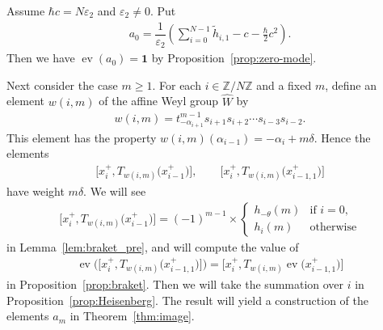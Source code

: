 \documentclass[10pt,a4paper]{amsart}
\theoremstyle{definition}
\numberwithin{equation}{section}
\DeclareMathOperator{\ev}{ev}
\newcommand{\ve}{\varepsilon}
\newcommand{\bbZ}{\mathbb{Z}}
\newcommand{\bfid}{\mathbf{1}}
\begin{document}
Assume $\hbar c = N \ve_2$ and $\ve_2 \neq 0$. Put
\begin{gather*}
a_0 = \dfrac{1}{\ve_2} \left( \sum_{i=0}^{N-1} \tilde{h}_{i,1} - c - \tfrac{\hbar}{2} c^2\right).
\end{gather*}
Then we have $\ev(a_0) = \bfid$ by Proposition~\ref{prop:zero-mode}.

Next consider the case $m \geq 1$. For each $i \in \bbZ/N\bbZ$ and a fixed $m$, define an element $w(i,m)$ of the affine Weyl group $\hat{W}$ by
\begin{gather*}
w(i,m) = t_{-\alpha_{i+1}}^{m-1} s_{i+1} s_{i+2} \cdots s_{i-3} s_{i-2}.
\end{gather*}
This element has the property $w(i,m)(\alpha_{i-1}) = -\alpha_{i} + m \delta$. Hence the elements
\begin{gather*}
\big[x_{i}^{+}, T_{w(i,m)}\big(x_{i-1}^{+}\big)\big],\qquad \big[x_{i}^{+}, T_{w(i,m)}\big(x_{i-1,1}^{+}\big)\big]
\end{gather*} have weight $m\delta$.
We will see
\begin{gather*}
\big[x_{i}^+, T_{w(i,m)}\big(x_{i-1}^+\big)\big] = (-1)^{m-1} \times \begin{cases}
h_{-\theta}(m) & \text{if $i=0$},\\
h_i(m) & \text{otherwise}
\end{cases}
\end{gather*}
in Lemma~\ref{lem:braket_pre}, and will compute the value of
\begin{gather*}
\ev \big( \big[x_{i}^{+}, T_{w(i,m)}\big(x_{i-1,1}^{+}\big)\big]\big) = \big[x_{i}^{+}, T_{w(i,m)}\ev\big(x_{i-1,1}^{+}\big)\big]
\end{gather*}
in Proposition~\ref{prop:braket}. Then we will take the summation over $i$ in Proposition~\ref{prop:Heisenberg}. The result will yield a construction of the elements $a_m$ in Theorem~\ref{thm:image}.
\end{document}
